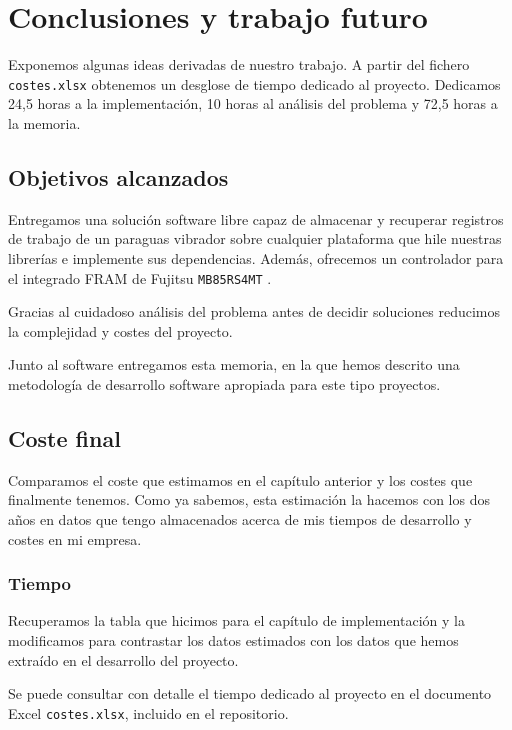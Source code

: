 \chapter{Conclusiones y trabajo futuro}

Exponemos algunas ideas derivadas de nuestro trabajo. A partir del
fichero \texttt{costes.xlsx} obtenemos un desglose de tiempo
dedicado al proyecto. Dedicamos 24,5 horas a la implementación,
10 horas al análisis del problema y 72,5 horas a la memoria.

\section{Objetivos alcanzados}

Entregamos una solución software libre capaz de almacenar
y recuperar registros de trabajo de un paraguas vibrador sobre
cualquier plataforma que hile nuestras librerías e implemente
sus dependencias. Además, ofrecemos un controlador para el
integrado FRAM de Fujitsu \texttt{MB85RS4MT} \cite{Fujitsu:MB85RS4MT}.

Gracias al cuidadoso análisis del problema antes de decidir
soluciones reducimos la complejidad y costes del proyecto.

Junto al software entregamos esta memoria, en la que hemos
descrito una metodología de desarrollo software apropiada
para este tipo proyectos.

\section{Coste final}

Comparamos el coste que estimamos en el capítulo anterior
y los costes que finalmente tenemos. Como ya sabemos, esta estimación
la hacemos con los dos años en datos que tengo almacenados acerca de mis
tiempos de desarrollo y costes en mi empresa.

\subsection{Tiempo}

Recuperamos la tabla que hicimos para el capítulo de implementación y la
modificamos para contrastar los datos estimados con los datos que hemos
extraído en el desarrollo del proyecto.

Se puede consultar con detalle el tiempo dedicado al proyecto en el
documento Excel \texttt{costes.xlsx}, incluido en el repositorio.

